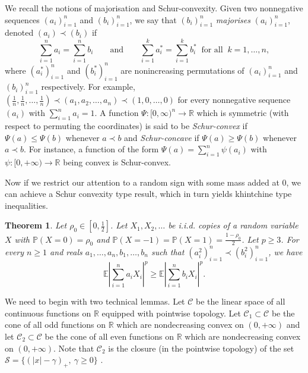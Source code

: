 \documentclass[10pt]{article}
\newcommand{\E}{\mathbb{E}}
\newcommand{\1}{\textbf{1}}
\newcommand{\R}{\mathbb{R}}
\newcommand{\p}[1]{\mathbb{P}\left( #1 \right)}
\newtheorem{theorem}{Theorem}
\theoremstyle{remark}
\theoremstyle{definition}
\begin{document}
 We recall the notions of majorisation and Schur-convexity. Given two nonnegative sequences $(a_i)_{i=1}^n$ and $(b_i)_{i=1}^n$, we say that $(b_i)_{i=1}^n$ \emph{majorises} $(a_i)_{i=1}^n$, denoted $(a_i) \prec (b_i)$ if
\[
\sum_{i=1}^n a_i = \sum_{i=1}^n b_i \qquad \text{and} \qquad \sum_{i=1}^k a_i^* = \sum_{i=1}^k b_i^* \ \text{ for all } \ k = 1,\ldots,n,
\]
where $(a_i^*)_{i=1}^n$ and $(b_i^*)_{i=1}^n$ are nonincreasing permutations of $(a_i)_{i=1}^n$ and $(b_i)_{i=1}^n$ respectively. For example, $(\frac{1}{n},\frac{1}{n},\dots,\frac{1}{n}) \prec (a_1,a_2,\dots,a_n) \prec (1,0,\dots,0)$ for every nonnegative sequence $(a_i)$ with $\sum_{i=1}^n a_i = 1$. A function $\Psi\colon [0,\infty)^n \to \R$ which is symmetric (with respect to permuting the coordinates) is said to be \emph{Schur-convex} if $\Psi(a) \leq \Psi(b)$ whenever $a \prec b$ and \emph{Schur-concave} if $\Psi(a) \geq \Psi(b)$ whenever $a \prec b$. For instance, a function of the form $\Psi(a) = \sum_{i=1}^n \psi(a_i)$ with $\psi\colon [0,+\infty) \to \R$ being convex is Schur-convex.

Now if we restrict our attention to a random sign with some mass added at 0, we can achieve a Schur convexity type result, which in turn yields khintchine type inequalities.

\begin{theorem}\label{thm:Schur}
Let $\rho_0 \in [0,\frac{1}{2}]$. Let $X_1,X_2,\ldots$ be i.i.d. copies of a random variable $X$ with $\p{X = 0} = \rho_0$ and $\p{X = -1} = \p{X = 1} = \frac{1-\rho_0}{2}$. Let $p \geq 3$. For every $n \geq 1$ and reals $a_1,\ldots,a_n, b_1, \ldots, b_n$ such that $(a_i^2)_{i=1}^n \prec (b_i^2)_{i=1}^n$, we have
\begin{equation}\label{eq:Schur}
\E\left|\sum_{i=1}^n a_iX_i \right|^p \geq \E\left|\sum_{i=1}^n b_iX_i \right|^p.
\end{equation}
\end{theorem}

We need to begin with two technical lemmas. Let $\mathcal{C}$ be the linear space of all continuous functions on $\R$ equipped with pointwise topology. Let $\mathcal{C}_{1} \subset \mathcal{C}$ be the cone of all odd functions on $\R$ which are nondecreasing convex on $(0,+\infty)$ and let $\mathcal{C}_{2} \subset \mathcal{C}$ be the cone of all even functions on $\R$ which are nondecreasing convex on $(0,+\infty)$. Note that $\mathcal{C}_{2}$ is the closure (in the pointwise topology) of the set $\mathcal{S} = \{(|x|-\gamma)_+, \ \gamma \geq 0\}$ .
\end{document}
